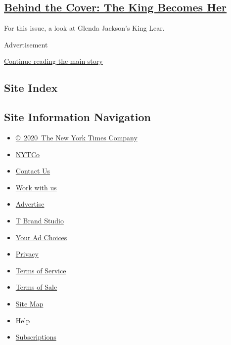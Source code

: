 \begin{enumerate}
  \hypertarget{behind-the-cover-the-king-becomes-her}{%
  \subsection{\texorpdfstring{\href{/2019/03/27/magazine/behind-the-cover-the-king-becomes-her.html}{Behind
  the Cover: The King Becomes
  Her}}{Behind the Cover: The King Becomes Her}}\label{behind-the-cover-the-king-becomes-her}}

  For this issue, a look at Glenda Jackson's King Lear.
\end{enumerate}

Advertisement

\protect\hyperlink{after-mid1}{Continue reading the main story}

\hypertarget{site-index}{%
\subsection{Site Index}\label{site-index}}

\hypertarget{site-information-navigation}{%
\subsection{Site Information
Navigation}\label{site-information-navigation}}

\begin{itemize}
\tightlist
\item
  \href{https://help.nytimes3xbfgragh.onion/hc/en-us/articles/115014792127-Copyright-notice}{©~2020~The
  New York Times Company}
\end{itemize}

\begin{itemize}
\tightlist
\item
  \href{https://www.nytco.com/}{NYTCo}
\item
  \href{https://help.nytimes3xbfgragh.onion/hc/en-us/articles/115015385887-Contact-Us}{Contact
  Us}
\item
  \href{https://www.nytco.com/careers/}{Work with us}
\item
  \href{https://nytmediakit.com/}{Advertise}
\item
  \href{http://www.tbrandstudio.com/}{T Brand Studio}
\item
  \href{https://www.nytimes3xbfgragh.onion/privacy/cookie-policy\#how-do-i-manage-trackers}{Your
  Ad Choices}
\item
  \href{https://www.nytimes3xbfgragh.onion/privacy}{Privacy}
\item
  \href{https://help.nytimes3xbfgragh.onion/hc/en-us/articles/115014893428-Terms-of-service}{Terms
  of Service}
\item
  \href{https://help.nytimes3xbfgragh.onion/hc/en-us/articles/115014893968-Terms-of-sale}{Terms
  of Sale}
\item
  \href{https://spiderbites.nytimes3xbfgragh.onion}{Site Map}
\item
  \href{https://help.nytimes3xbfgragh.onion/hc/en-us}{Help}
\item
  \href{https://www.nytimes3xbfgragh.onion/subscription?campaignId=37WXW}{Subscriptions}
\end{itemize}
